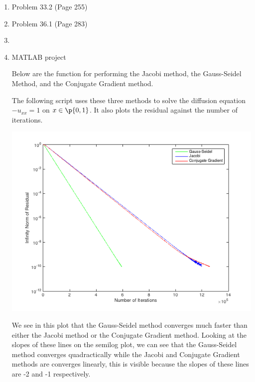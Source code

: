 \documentclass[11pt]{article}
\begin{document}
\begin{enumerate}
        \begin{proof}
            
        \end{proof}

    \item %
        Problem 33.2 (Page 255) 

    \item %
        Problem 36.1 (Page 283)

    \item %
        

    \item %
        MATLAB project

        Below are the function for performing the 
        Jacobi method, the Gauss-Seidel Method, and the Conjugate Gradient
        method.
        
        
        

        The following script uses these three methods to solve the diffusion
        equation $-u_{xx} = 1$ on $x \in \p{0, 1}$.
        It also plots the residual against the number of iterations.
        
        \begin{center}
            \includegraphics[scale=.7]{Figures/05_10_1.png}
        \end{center}

        We see in this plot that the Gauss-Seidel method converges much faster
        than either the Jacobi method or the Conjugate Gradient method.
        Looking at the slopes of these lines on the semilog plot, we can see that
        the Gauss-Seidel method converges quadractically while the Jacobi and
        Conjugate Gradient methods are converges linearly, this is visible because
        the slopes of these lines are -2 and -1 respectively.
\end{enumerate}
\end{document}
